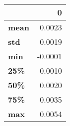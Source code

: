 \begin{tabular}{lr}
\toprule
{} &       0 \\
\midrule
\textbf{mean} &  0.0023 \\
\textbf{std } &  0.0019 \\
\textbf{min } & -0.0001 \\
\textbf{25\% } &  0.0010 \\
\textbf{50\% } &  0.0020 \\
\textbf{75\% } &  0.0035 \\
\textbf{max } &  0.0054 \\
\bottomrule
\end{tabular}
